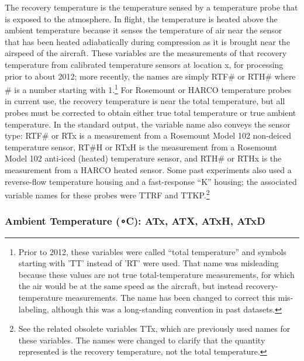 \documentclass[
  english,
]{book}
\begin{document}
The recovery temperature is the temperature sensed by a temperature probe that is exposed to the atmosphere. In flight, the temperature is heated above the ambient temperature because it senses the temperature of air near the sensor that has been heated adiabatically during compression as it is brought near the airspeed of the aircraft. These variables are the measurements of that recovery temperature from calibrated temperature sensors at location x, for processing prior to about 2012; more recently, the names are simply RTF\# or RTH\# where \# is a number starting with 1.\footnote{Prior to 2012, these variables were called ``total temperature'' and symbols starting with 'TT' instead of 'RT' were used. That name was misleading because these values are not true total-temperature measurements, for which the air would be at the same speed as the aircraft, but instead recovery-temperature measurements. The name has been changed to correct this mis-labeling, although this was a long-standing convention in past datasets.}
For Rosemount or HARCO temperature probes in current use, the recovery temperature is near the total temperature, but all probes must be corrected to obtain either true total temperature or true ambient temperature. In the standard output, the variable name also conveys the sensor type: RTF\# or RTx is a measurement from a Rosemount Model 102 non-deiced temperature sensor, RT\#H or RTxH is the measurement from a Rosemount Model 102 anti-iced (heated) temperature sensor, and RTH\# or RTHx is the measurement from a HARCO heated sensor. Some past experiments also used a reverse-flow temperature housing and a fast-response ``K'' housing; the associated variable names for these probes were TTRF and TTKP.\footnote{See the related obsolete variables TTx, which are previously used names for these variables. The names were changed to clarify that the quantity represented is the recovery temperature, not the total temperature.}

\hypertarget{ambient-t}{%
\subsubsection*{\texorpdfstring{Ambient Temperature ({∘}C): ATx, ATX, ATxH, ATxD}{Ambient Temperature (∘C): ATx, ATX, ATxH, ATxD}}\label{ambient-t}}
\end{document}
